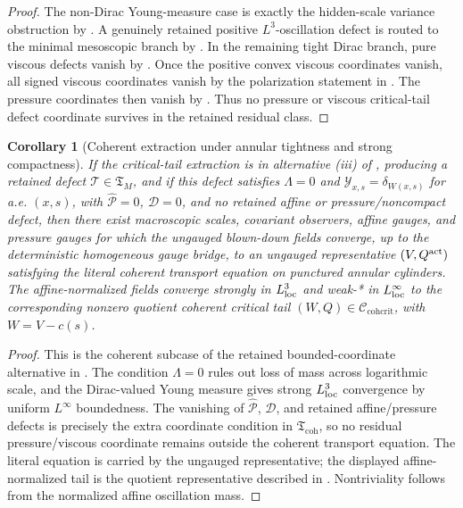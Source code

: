 \documentclass[11pt]{amsart}
\numberwithin{equation}{section}
\theoremstyle{plain}
\newtheorem{corollary}[corollary]{Corollary}
\theoremstyle{definition}
\theoremstyle{remark}
\newcommand{\Ccohcrit}{\mathcal C_{\mathrm{cohcrit}}}
\newcommand{\Tcrit}{\mathfrak T_M}
\newcommand{\Tcoh}{\mathfrak T_{\mathrm{coh}}}
\begin{document}
\begin{proof}
The non-Dirac Young-measure case is exactly the hidden-scale variance obstruction
by .  A genuinely retained positive
\(L^3\)-oscillation defect is routed to the minimal mesoscopic branch by
.  In the remaining tight Dirac branch,
pure viscous defects vanish by
.  Once the positive convex viscous
coordinates vanish, all signed viscous coordinates vanish by the polarization
statement in .  The pressure
coordinates then vanish by .  Thus no
pressure or viscous critical-tail defect coordinate survives in the retained
residual class.
\end{proof}

\begin{corollary}[Coherent extraction under annular tightness and strong compactness]
\label{cor:coherent-critical-tail-extraction}
If the critical-tail extraction is in alternative \textup{(iii)} of
, producing a retained
defect \(\mathcal T\in\Tcrit\), and if this defect satisfies
\(\Lambda=0\) and
\(\mathcal Y_{x,s}=\delta_{W(x,s)}\) for a.e. \((x,s)\), with
\(\widehat{\mathscr P}=0\), \(\mathscr D=0\), and no retained affine or
pressure/noncompact defect, then there exist
macroscopic scales, covariant observers, affine gauges, and pressure gauges for
which the ungauged blown-down fields converge, up to the deterministic
homogeneous gauge bridge, to an ungauged representative \((V,Q^{\rm act})\)
satisfying the literal coherent transport equation on punctured annular
cylinders.  The affine-normalized fields converge strongly in \(L^3_{\rm loc}\)
and weak-* in \(L^\infty_{\rm loc}\) to the corresponding nonzero quotient
coherent critical tail \((W,Q)\in\Ccohcrit\), with \(W=V-c(s)\).
\end{corollary}

\begin{proof}
This is the coherent subcase of the retained bounded-coordinate alternative in
.  The condition
\(\Lambda=0\) rules out loss of mass across logarithmic scale, and the
Dirac-valued Young measure gives strong \(L^3_{\rm loc}\) convergence by
uniform \(L^\infty\) boundedness.  The vanishing of
\(\widehat{\mathscr P}\), \(\mathscr D\), and retained affine/pressure defects is
precisely the extra coordinate condition in \(\Tcoh\), so no residual
pressure/viscous coordinate remains outside the coherent transport equation.
The literal equation is carried by the ungauged representative; the displayed
affine-normalized tail is the quotient representative described in
.  Nontriviality follows from the
normalized affine oscillation mass.
\end{proof}
\end{document}
